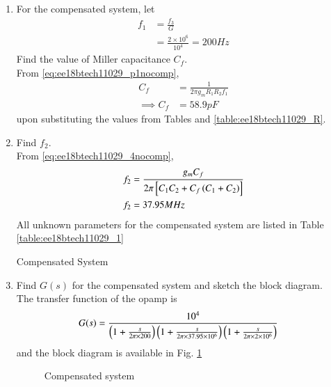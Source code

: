 \begin{enumerate}[label=\thesection.\arabic*.,ref=\thesection.\theenumi]
\item For the compensated system, let
\begin{align}
f_1  &= \frac{f_{3}}{G}\\
    &= \frac{2\times10^{6}}{10^{4}} = 200 Hz
\end{align}
%
Find the value of Miller capacitance $C_f$.
\\
\solution From     \eqref{eq:ee18btech11029_p1nocomp},
%    
\begin{align}
    C_{f}&=\frac{1}{2\pi g_{m}R_{1}R_{2}f_{1}}
\\
\implies         C_{f}&=58.9pF
\end{align}
upon substituting the values from Tables \label{table:ee18btech11029_ Input_Table}
 and \ref{table:ee18btech11029_R}.
\item Find $f_2$.
\\
\solution
From     \eqref{eq:ee18btech11029_4nocomp},
\begin{align}
    f_{2} &= \frac{g_{m}C_{f}}{2\pi{}\left[C_{1}C_{2} + C_{f}\left({C_{1}+C_{2}}\right)\right]}
\\
    f_{2}&=37.95MHz
\end{align}
%
All unknown parameters for the compensated system are listed in Table  \ref{table:ee18btech11029_1}

\begin{table}[!t]
\centering

\caption{Compensated System}
\label{table:ee18btech11029_1}
\end{table}

\item Find $G(s)$ for the compensated system and sketch the block diagram.\\
\solution The transfer function of the opamp is
\begin{align}
   G(s)&= \frac{10^{4}}{\left(1+\frac{s}{2\pi\times200}\right)\left(1+\frac{s}{2\pi\times37.95\times10^{6}}\right)\left(1+\frac{s}{2\pi\times2\times10^{6}}\right)}
\end{align}
and the block diagram is available in Fig. 	\ref{fig:ee18btech11029_block_comp}

\begin{figure}[ht!]
	\begin{center}
		\resizebox{\columnwidth}{!}{}
	\end{center}
	\caption{Compensated system}
	\label{fig:ee18btech11029_block_comp}
\end{figure}


\end{enumerate}
